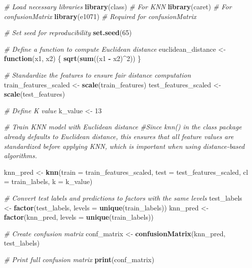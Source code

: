 \documentclass[
]{article}
\newenvironment{Shaded}{\begin{snugshade}}{\end{snugshade}}
\newcommand{\AttributeTok}[1]{\textcolor[rgb]{0.13,0.29,0.53}{#1}}
\newcommand{\CommentTok}[1]{\textcolor[rgb]{0.56,0.35,0.01}{\textit{#1}}}
\newcommand{\ControlFlowTok}[1]{\textcolor[rgb]{0.13,0.29,0.53}{\textbf{#1}}}
\newcommand{\DecValTok}[1]{\textcolor[rgb]{0.00,0.00,0.81}{#1}}
\newcommand{\FunctionTok}[1]{\textcolor[rgb]{0.13,0.29,0.53}{\textbf{#1}}}
\newcommand{\NormalTok}[1]{#1}
\newcommand{\OtherTok}[1]{\textcolor[rgb]{0.56,0.35,0.01}{#1}}
\newcommand{\SpecialCharTok}[1]{\textcolor[rgb]{0.81,0.36,0.00}{\textbf{#1}}}
\begin{document}
\begin{Shaded}
\begin{Highlighting}[]
\CommentTok{\# Load necessary libraries}
\FunctionTok{library}\NormalTok{(class)  }\CommentTok{\# For KNN}
\FunctionTok{library}\NormalTok{(caret)  }\CommentTok{\# For confusionMatrix}
\FunctionTok{library}\NormalTok{(e1071)  }\CommentTok{\# Required for confusionMatrix}

\CommentTok{\# Set seed for reproducibility}
\FunctionTok{set.seed}\NormalTok{(}\DecValTok{65}\NormalTok{)}

\CommentTok{\# Define a function to compute Euclidean distance}
\NormalTok{euclidean\_distance }\OtherTok{\textless{}{-}} \ControlFlowTok{function}\NormalTok{(x1, x2) \{}
  \FunctionTok{sqrt}\NormalTok{(}\FunctionTok{sum}\NormalTok{((x1 }\SpecialCharTok{{-}}\NormalTok{ x2)}\SpecialCharTok{\^{}}\DecValTok{2}\NormalTok{))}
\NormalTok{\}}

\CommentTok{\# Standardize the features to ensure fair distance computation}
\NormalTok{train\_features\_scaled }\OtherTok{\textless{}{-}} \FunctionTok{scale}\NormalTok{(train\_features)}
\NormalTok{test\_features\_scaled }\OtherTok{\textless{}{-}} \FunctionTok{scale}\NormalTok{(test\_features)}

\CommentTok{\# Define K value}
\NormalTok{k\_value }\OtherTok{\textless{}{-}} \DecValTok{13}

\CommentTok{\# Train KNN model with Euclidean distance}
\CommentTok{\#Since knn() in the class package already defaults to Euclidean distance, this ensures that all feature values are standardized before applying KNN, which is important when using distance{-}based algorithms.}

\NormalTok{knn\_pred }\OtherTok{\textless{}{-}} \FunctionTok{knn}\NormalTok{(}\AttributeTok{train =}\NormalTok{ train\_features\_scaled, }
                \AttributeTok{test =}\NormalTok{ test\_features\_scaled, }
                \AttributeTok{cl =}\NormalTok{ train\_labels, }
                \AttributeTok{k =}\NormalTok{ k\_value)}

\CommentTok{\# Convert test labels and predictions to factors with the same levels}
\NormalTok{test\_labels }\OtherTok{\textless{}{-}} \FunctionTok{factor}\NormalTok{(test\_labels, }\AttributeTok{levels =} \FunctionTok{unique}\NormalTok{(train\_labels))}
\NormalTok{knn\_pred }\OtherTok{\textless{}{-}} \FunctionTok{factor}\NormalTok{(knn\_pred, }\AttributeTok{levels =} \FunctionTok{unique}\NormalTok{(train\_labels))}

\CommentTok{\# Create confusion matrix}
\NormalTok{conf\_matrix }\OtherTok{\textless{}{-}} \FunctionTok{confusionMatrix}\NormalTok{(knn\_pred, test\_labels)}

\CommentTok{\# Print full confusion matrix}
\FunctionTok{print}\NormalTok{(conf\_matrix)}
\end{Highlighting}
\end{Shaded}
\end{document}
